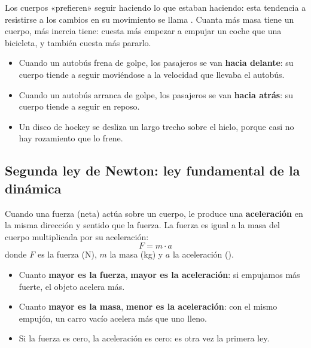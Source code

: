 Los cuerpos «prefieren» seguir haciendo lo que estaban haciendo: esta tendencia a resistirse a los cambios en su movimiento se llama . Cuanta más masa tiene un cuerpo, más inercia tiene: cuesta más empezar a empujar un coche que una bicicleta, y también cuesta más pararlo.

\begin{example}
    \begin{itemize}
        \item Cuando un autobús frena de golpe, los pasajeros se van \textbf{hacia delante}: su cuerpo tiende a seguir moviéndose a la velocidad que llevaba el autobús.
        \item Cuando un autobús arranca de golpe, los pasajeros se van \textbf{hacia atrás}: su cuerpo tiende a seguir en reposo.
        \item Un disco de hockey se desliza un largo trecho sobre el hielo, porque casi no hay rozamiento que lo frene.
    \end{itemize}
\end{example}

\subsection{Segunda ley de Newton: ley fundamental de la dinámica}

\begin{definition}
    Cuando una fuerza (neta) actúa sobre un cuerpo, le produce una \textbf{aceleración} en la misma dirección y sentido que la fuerza. La fuerza es igual a la masa del cuerpo multiplicada por su aceleración:
    \begin{equation*}
        F = m \cdot a
    \end{equation*}
    donde \(F\) es la fuerza (\unit{\newton}), \(m\) la masa (\unit{\kg}) y \(a\) la aceleración (\unit{\mpss}).
\end{definition}

\begin{impt}
    \begin{itemize}
        \item Cuanto \textbf{mayor es la fuerza}, \textbf{mayor es la aceleración}: si empujamos más fuerte, el objeto acelera más.
        \item Cuanto \textbf{mayor es la masa}, \textbf{menor es la aceleración}: con el mismo empujón, un carro vacío acelera más que uno lleno.
        \item Si la fuerza es cero, la aceleración es cero: es otra vez la primera ley.
    \end{itemize}
\end{impt}

